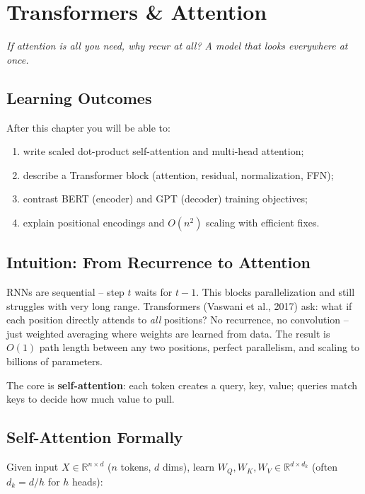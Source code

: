 \chapter{Transformers \& Attention}\label{ch:transformer}
\begin{center}\small\textit{If attention is all you need, why recur at all? A model that looks everywhere at once.}\end{center}

\noindent{}
\vspace{0.3em}
\section*{Learning Outcomes}
After this chapter you will be able to:
\begin{enumerate}[label=(L\arabic*)]
    \item write scaled dot-product self-attention and multi-head attention;
    \item describe a Transformer block (attention, residual, normalization, FFN);
    \item contrast BERT (encoder) and GPT (decoder) training objectives;
    \item explain positional encodings and $O(n^2)$ scaling with efficient fixes.
\end{enumerate}

\section{Intuition: From Recurrence to Attention}
RNNs are sequential -- step $t$ waits for $t-1$. This blocks parallelization and still struggles with very long range. Transformers (Vaswani et al., 2017) ask: what if each position directly attends to \emph{all} positions? No recurrence, no convolution -- just weighted averaging where weights are learned from data. The result is $O(1)$ path length between any two positions, perfect parallelism, and scaling to billions of parameters.

The core is \textbf{self-attention}: each token creates a query, key, value; queries match keys to decide how much value to pull.

\section{Self-Attention Formally}
Given input $X\in\mathbb{R}^{n\times d}$ ($n$ tokens, $d$ dims), learn $W_Q,W_K,W_V\in\mathbb{R}^{d\times d_k}$ (often $d_k=d/h$ for $h$ heads):

